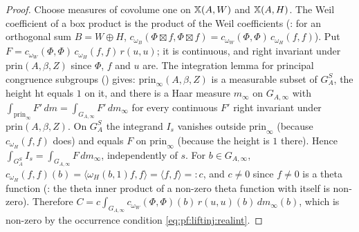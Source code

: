 \begin{proof}
Choose measures of covolume one on $\mathbb{X}(A,W)$ and $\mathbb{X}(A,H)$. The Weil coefficient of a box product is the product of the Weil coefficients
(: for an orthogonal sum $B=W\oplus H$,
$c_{\omega_B}(\Phi\boxtimes f,\Phi\boxtimes f)=c_{\omega_W}(\Phi,\Phi)\,c_{\omega_H}(f,f)$). Put $F=c_{\omega_W}(\Phi,\Phi)\,c_{\omega_H}(f,f)\,r(u,u)$; it is
continuous, and right invariant under $\mathrm{prin}(A,\beta,Z)$ since $\Phi$, $f$ and $u$ are. The integration lemma for principal congruence subgroups
() gives: $\mathrm{prin}_\infty(A,\beta,Z)$ is a measurable subset of
$G_A^S$, the height $\mathrm{ht}$ equals $1$ on it, and there is a Haar measure $m_\infty$ on $G_{A,\infty}$ with
$\int_{\mathrm{prin}_\infty}F'\,dm=\int_{G_{A,\infty}}F'\,dm_\infty$ for every continuous $F'$ right invariant under $\mathrm{prin}(A,\beta,Z)$. On
$G_A^S$ the integrand $I_s$ vanishes outside $\mathrm{prin}_\infty$ (because $c_{\omega_H}(f,f)$ does) and equals $F$ on $\mathrm{prin}_\infty$ (because the
height is $1$ there). Hence $\int_{G_A^S}I_s=\int_{G_{A,\infty}}F\,dm_\infty$, independently of $s$. For $b\in G_{A,\infty}$,
$c_{\omega_H}(f,f)(b)=\langle\omega_H(b,1)f,f\rangle=\langle f,f\rangle=:c$, and $c\ne0$ since $f\ne0$ is a theta function
(: the theta inner product of a non-zero theta function with itself is non-zero).
Therefore $C=c\int_{G_{A,\infty}}c_{\omega_W}(\Phi,\Phi)(b)\,r(u,u)(b)\,dm_\infty(b)$, which is non-zero by the occurrence condition
\eqref{eq:pf:liftinj:realint}.
\end{proof}

